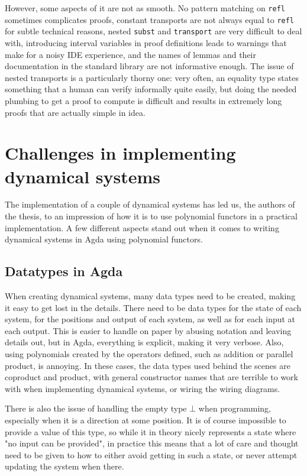 However, some aspects of it are not as smooth. No pattern matching on \texttt{refl} sometimes complicates proofs, constant transports are not always equal to \texttt{refl} for subtle technical reasons, nested \texttt{subst} and \texttt{transport} are very difficult to deal with, introducing interval variables in proof definitions leads to warnings that make for a noisy IDE experience, and the names of lemmas and their documentation in the standard library are not informative enough. The issue of nested transports is a particularly thorny one: very often, an equality type states something that a human can verify informally quite easily, but doing the needed plumbing to get a proof to compute is difficult and results in extremely long proofs that are actually simple in idea.

\section{Challenges in implementing dynamical systems}
The implementation of a couple of dynamical systems has led us, the authors of the thesis, to an impression of how it is to use polynomial functors in a practical implementation. A few different aspects stand out when it comes to writing dynamical systems in Agda using polynomial functors.

\subsection{Datatypes in Agda}

When creating dynamical systems, many data types need to be created, making it easy to get lost in the details. There need to be data types for the state of each system, for the positions and output of each system, as well as for each input at each output. This is easier to handle on paper by abusing notation and leaving details out, but in Agda, everything is explicit, making it very verbose. Also, using polynomials created by the operators defined, such as addition or parallel product, is annoying. In these cases, the data types used behind the scenes are coproduct and product, with general constructor names that are terrible to work with when implementing dynamical systems, or wiring the wiring diagrams.

There is also the issue of handling the empty type $\bot$ when programming, especially when it is a direction at some position. It is of course impossible to provide a value of this type, so while it in theory nicely represents a state where "no input can be provided", in practice this means that a lot of care and thought need to be given to how to either avoid getting in such a state, or never attempt updating the system when there.

